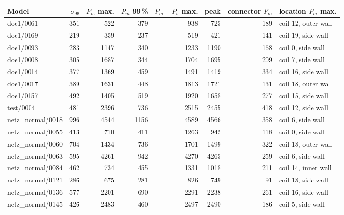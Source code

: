 \begin{tabular}{@{}lrrrrrrl@{}}\toprule
Model & $\sigma_{99}$ & $P_m$ max. & $P_m$ 99\,\% & $P_m{+}P_b$ max. & peak & connector $P_m$ & location $P_m$ max. \\\midrule
doe1/0061 & \num{351} & \num{522} & \num{379} & \num{938} & \num{725} & \num{189} & coil 12, outer wall \\
doe1/0169 & \num{219} & \num{359} & \num{237} & \num{519} & \num{421} & \num{141} & coil 19, side wall \\
doe1/0093 & \num{283} & \num{1147} & \num{340} & \num{1233} & \num{1190} & \num{168} & coil 0, side wall \\
doe1/0008 & \num{305} & \num{1687} & \num{344} & \num{1704} & \num{1695} & \num{209} & coil 7, side wall \\
doe1/0014 & \num{377} & \num{1369} & \num{459} & \num{1491} & \num{1419} & \num{334} & coil 16, side wall \\
doe1/0017 & \num{389} & \num{1631} & \num{448} & \num{1813} & \num{1721} & \num{131} & coil 18, outer wall \\
doe1/0157 & \num{492} & \num{1405} & \num{519} & \num{1920} & \num{1658} & \num{277} & coil 15, side wall \\
test/0004 & \num{481} & \num{2396} & \num{736} & \num{2515} & \num{2455} & \num{418} & coil 12, side wall \\
netz\_normal/0018 & \num{996} & \num{4544} & \num{1156} & \num{4589} & \num{4566} & \num{358} & coil 6, side wall \\
netz\_normal/0055 & \num{413} & \num{710} & \num{411} & \num{1263} & \num{942} & \num{118} & coil 0, side wall \\
netz\_normal/0060 & \num{704} & \num{1434} & \num{736} & \num{1701} & \num{1499} & \num{322} & coil 18, outer wall \\
netz\_normal/0063 & \num{595} & \num{4261} & \num{942} & \num{4270} & \num{4265} & \num{259} & coil 6, side wall \\
netz\_normal/0084 & \num{462} & \num{734} & \num{455} & \num{1331} & \num{1018} & \num{211} & coil 14, inner wall \\
netz\_normal/0121 & \num{286} & \num{675} & \num{281} & \num{826} & \num{749} & \num{91} & coil 18, side wall \\
netz\_normal/0136 & \num{577} & \num{2201} & \num{690} & \num{2291} & \num{2238} & \num{261} & coil 16, side wall \\
netz\_normal/0145 & \num{426} & \num{2483} & \num{460} & \num{2497} & \num{2490} & \num{186} & coil 5, side wall \\

\end{tabular}
